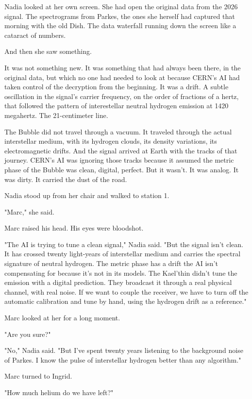 \documentclass[11pt,a5paper,twoside]{book}
\begin{document}
Nadia looked at her own screen. She had open the original data from the 2026 signal. The spectrograms from Parkes, the ones she herself had captured that morning with the old Dish. The data waterfall running down the screen like a cataract of numbers.

And then she saw something.

It was not something new. It was something that had always been there, in the original data, but which no one had needed to look at because CERN's AI had taken control of the decryption from the beginning. It was a drift. A subtle oscillation in the signal's carrier frequency, on the order of fractions of a hertz, that followed the pattern of interestellar neutral hydrogen emission at 1420 megahertz. The 21-centimeter line.

The Bubble did not travel through a vacuum. It traveled through the actual interstellar medium, with its hydrogen clouds, its density variations, its electromagnetic drifts. And the signal arrived at Earth with the tracks of that journey. CERN's AI was ignoring those tracks because it assumed the metric phase of the Bubble was clean, digital, perfect. But it wasn't. It was analog. It was dirty. It carried the dust of the road.

Nadia stood up from her chair and walked to station 1.

"Marc," she said.

Marc raised his head. His eyes were bloodshot.

"The AI is trying to tune a clean signal," Nadia said. "But the signal isn't clean. It has crossed twenty light-years of interstellar medium and carries the spectral signature of neutral hydrogen. The metric phase has a drift the AI isn't compensating for because it's not in its models. The Kael'thin didn't tune the emission with a digital prediction. They broadcast it through a real physical channel, with real noise. If we want to couple the receiver, we have to turn off the automatic calibration and tune by hand, using the hydrogen drift as a reference."

Marc looked at her for a long moment.

"Are you sure?"

"No," Nadia said. "But I've spent twenty years listening to the background noise of Parkes. I know the pulse of interstellar hydrogen better than any algorithm."

Marc turned to Ingrid.

"How much helium do we have left?"
\end{document}
